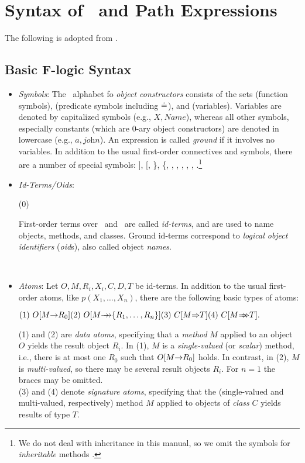 \section{Syntax of \fl\ and Path Expressions }

The following is adopted from \cite{ludaescher-himmeroeder-IS-98}.


\subsection{Basic F-logic Syntax}\label{sec-basic-flogic}


\begin{itemize}
\item \emph{Symbols}: The \fl\ alphabet fo \emph{object constructors}
  consists of the sets \funcs (function symbols), \preds (predicate symbols
  including $\doteq$), and \vars (variables).  Variables are denoted by
  capitalized symbols (e.g., $X,\textit{Name}$), whereas all other symbols,
  especially constants (which are 0-ary object constructors) are denoted in
  lowercase (e.g., $a,\textit{john}$).  An expression is called
  \emph{ground} if it involves no variables.  In addition to the usual
  first-order connectives and symbols, there are a number of special
  symbols: ], [, \}, \{, \fd, \mvd, \Fd, \Mvd,
  \isa, \subcl.\footnote{
    We do not deal with inheritance in this manual, so we
    omit the symbols for \emph{inheritable} methods
    \cite{KLW95}.
    }
\item \emph{Id-Terms/Oids}:  \medskip
  
  \hfill (0)
  \begin{minipage}[t]{.80\textwidth}
    First-order terms over \funcs\ and \vars\ are called
    \emph{id-terms}, and are used to name objects, methods, and
    classes.  Ground id-terms correspond to \emph{logical object
      identifiers} (\emph{oid}s), also called object \emph{names}.
  \end{minipage}
  \hfill ~
\item \emph{Atoms}: Let $O,M,R_{i},X_{i},C,D,T$ be id-terms.  In
  addition to the usual first-order atoms, like $p(X_1,\dots,X_n)$, there
  are the following basic types of atoms: \medskip

  \begin{math}
    \hfill (1)~O[M\fd R_0] \hfill (2)~O[M\mvd \{R_1,\dots,R_n\}]
    \hfill (3)~C[M\Fd T] \hfill (4)~C[M\Mvd T]. \hfill
  \end{math} \medskip
  
  (1) and (2) are \emph{data atoms}, specifying that a \emph{method} $M$
  applied to an object $O$ yields the result object $R_i$. In (1), $M$ is a
  \emph{single-valued} (or \emph{scalar}) method, i.e., there is
  at most one $R_0$ such that $O[M{\rightarrow} R_0]$ holds. In contrast, in
  (2), $M$ is \emph{multi-valued}, so there may be several result
  objects $R_i$. For $n=1$ the braces may be omitted.\\
  (3) and (4) denote \emph{signature atoms}, specifying that the
  (single-valued and multi-valued, respectively) method $M$ applied to
  objects of \emph{class} $C$ yields results of type $T$.
  

\end{itemize}
